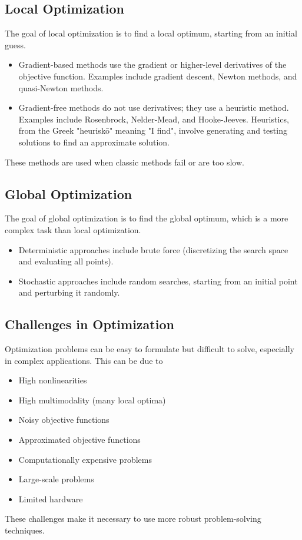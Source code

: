 \subsection*{Local Optimization}
The goal of local optimization is to find a local optimum, starting from an initial guess.
\begin{itemize}
    \item Gradient-based methods use the gradient or higher-level derivatives of the objective function. Examples include gradient descent, Newton methods, and quasi-Newton methods.
    \item Gradient-free methods do not use derivatives; they use a heuristic method. Examples include Rosenbrock, Nelder-Mead, and Hooke-Jeeves. Heuristics, from the Greek "heuriskō" meaning "I find", involve generating and testing solutions to find an approximate solution.
\end{itemize}
These methods are used when classic methods fail or are too slow.

\subsection*{Global Optimization}
The goal of global optimization is to find the global optimum, which is a more complex task than local optimization.
\begin{itemize}
    \item Deterministic approaches include brute force (discretizing the search space and evaluating all points).
    \item Stochastic approaches include random searches, starting from an initial point and perturbing it randomly.
\end{itemize}

\subsection*{Challenges in Optimization}
Optimization problems can be easy to formulate but difficult to solve, especially in complex applications. This can be due to
\begin{itemize}
    \item High nonlinearities
    \item High multimodality (many local optima)
    \item Noisy objective functions
    \item Approximated objective functions
    \item Computationally expensive problems
    \item Large-scale problems
    \item Limited hardware
\end{itemize}
These challenges make it necessary to use more robust problem-solving techniques.

